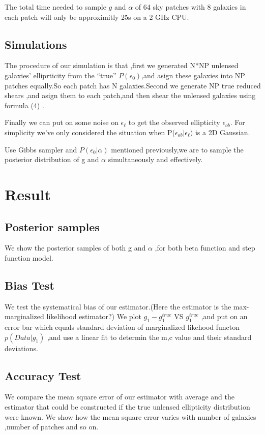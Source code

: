 \documentclass[useAMS,usenatbib]{mn2e}
\begin{document}
The total time needed to sample $g$ and $\alpha$ of 64 sky patches
with 8 galaxies in each patch will only be approximitly 25s on a 2
GHz CPU.


\subsection{Simulations}

The procedure of our simulation is that ,first we generated N{*}NP
unlensed galaxies' elliprticity from the ``true'' $P(\epsilon_{0})$,and
asign these galaxies into NP patches equally.So each patch has N galaxies.Second
we generate NP true reduced shears ,and asign them to each patch,and
then shear the unlensed galaxies using formula (4) .

Finally we can put on some noise on $\epsilon_{\ell}$ to get the
observed ellipticity $\epsilon_{ob}$. For simplicity we've only considered
the situation when P($\epsilon_{ob}|\epsilon_{\ell})$ is a 2D Gaussian.

Use Gibbs sampler and $P(\epsilon_{0}|\alpha)$ mentioned previously,we
are to sample the posterior distribution of g and $\alpha$ simultaneously
and effectively.




\section{Result}
\label{sec:XXX}

\subsection{Posterior samples}
We show the posterior samples of both g and $\alpha$ ,for both beta function and step function model.
\subsection{Bias Test}
We test the systematical bias of our estimator.(Here the estimator is the max-marginalized likelihood estimator?)
We plot $g_{1}-g_{1}^{true}$ VS $g_{1}^{true}$ ,and put on an error bar which equals standard deviation of 
marginalized likehood functon $p(Data|g_{1})$ ,and use a linear fit to determin the m,c value and their standard 
deviations.

\subsection{Accuracy Test}
We compare the mean square error of our estimator with average and the estimator that could be constructed if the true unlensed
ellipticity distribution were known.
We show how the mean square error varies with number of galaxies ,number of patches and so on.
\end{document}
